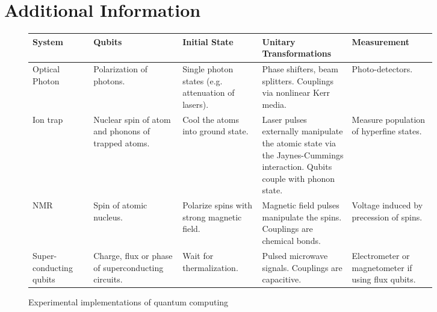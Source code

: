 \documentclass[reqno]{amsart}
\numberwithin{equation}{section}
\numberwithin{figure}{section}
\begin{document}
\section{\\Additional Information}
\begin{figure}[h]
    \begin{tabular}{p{0.13\linewidth}||p{0.19\linewidth}|p{0.17\linewidth}|p{0.19\linewidth}|p{0.18\linewidth}}
        System & Qubits & Initial State & Unitary Transformations & Measurement \\
        \hline\hline
        Optical Photon \cite{KnillLaflammeMilburn2001} & Polarization of photons. & Single photon states (e.g. attenuation of lasers). &  Phase shifters, beam splitters. Couplings via nonlinear Kerr media. & Photo-detectors. \\
        \hline
        Ion trap \cite{CiracZoller1995} & Nuclear spin of atom and phonons of trapped atoms. & Cool the atoms into ground state. & Laser pulses externally manipulate the atomic state via the Jaynes-Cummings interaction. Qubits couple with phonon state. & Measure population of hyperfine states. \\
        \hline
        NMR \cite{Lloyd1993} & Spin of atomic nucleus. & Polarize spins with strong magnetic field. & Magnetic field pulses manipulate the spins. Couplings are chemical bonds. & Voltage induced by precession of spins. \\
        \hline
        Super-conducting qubits \cite{Huang2020} & Charge, flux or phase of superconducting circuits. & Wait for thermalization. & Pulsed microwave signals. Couplings are capacitive. & Electrometer or magnetometer if using flux qubits. \\
    \end{tabular}
    \caption{Experimental implementations of quantum computing}
    \label{fig:ExperimentalImplementations}
\end{figure}
\end{document}
